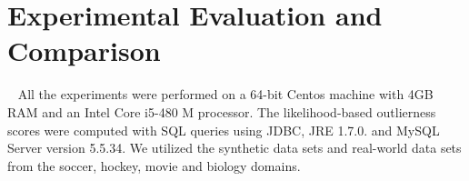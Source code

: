 {				%
				
				
				
				
				

				\section{Experimental Evaluation and Comparison}~\label{sec:Experiments}
				All the experiments were performed on a 64-bit Centos machine with 4GB RAM and an Intel Core i5-480 M processor. The likelihood-based outlierness scores were computed with SQL queries using JDBC, JRE 1.7.0. and MySQL Server version 5.5.34.
				We utilized the synthetic data sets and real-world data sets from the soccer, hockey, movie and biology domains.
				
}

